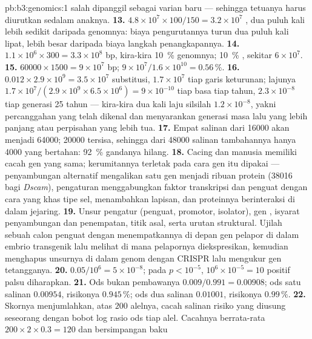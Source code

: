 \begin{solution}{pb:b3:genomics:1}
salah dipanggil sebagai varian baru --- sehingga tetuanya harus diurutkan
sedalam anaknya.
\textbf{13.} $4.8\times 10^{7}\times 100/150 = 3.2\times 10^{7}$ ,
dua puluh kali lebih sedikit daripada genomnya: biaya pengurutannya turun
dua puluh kali lipat, lebih besar daripada biaya langkah penangkapannya.
\textbf{14.} $1.1\times 10^{6}\times 300 = 3.3\times 10^{8}$ bp, kira-kira
\qty{10}{\%} genomnya; \qty{10}{\%} , sekitar $6\times
10^{7}$.
\textbf{15.} $\num{60000}\times 1500 = 9\times 10^{7}$ bp; $9\times
10^{7}/1.6\times 10^{10} = 0.56\,\%$.
\textbf{16.} $0.012\times 2.9\times 10^{9} = 3.5\times 10^{7}$
substitusi, $1.7\times 10^{7}$ tiap garis keturunan; lajunya $1.7\times
10^{7}/(2.9\times 10^{9}\times 6.5\times 10^{6}) = 9\times 10^{-10}$
tiap basa tiap tahun, $2.3\times 10^{-8}$ tiap generasi 25 tahun ---
kira-kira dua kali laju silsilah $1.2\times 10^{-8}$, yakni percanggahan yang
telah dikenal dan menyarankan generasi masa lalu yang lebih panjang atau
perpisahan yang lebih tua.
\textbf{17.} Empat salinan dari \num{16000} akan menjadi \num{64000};
\num{20000} tersisa, sehingga dari \num{48000} salinan tambahannya hanya
\num{4000} yang bertahan: \qty{92}{\%} gandanya hilang.
\textbf{18.} Cacing dan manusia memiliki cacah gen yang sama; kerumitannya
terletak pada cara gen itu dipakai --- penyambungan alternatif mengalikan satu
gen menjadi ribuan protein (\num{38016} bagi \emph{Dscam}), pengaturan
menggabungkan faktor transkripsi dan penguat dengan cara yang khas tipe sel,
 menambahkan lapisan, dan proteinnya berinteraksi di dalam
jejaring.
\textbf{19.} Unsur pengatur (penguat, promotor, isolator),
gen , isyarat penyambungan dan penempatan, titik asal, serta
urutan struktural. Ujilah sebuah calon penguat dengan menempatkannya di depan
gen pelapor di dalam embrio transgenik lalu melihat di mana pelapornya
diekspresikan, kemudian menghapus unsurnya di dalam genom dengan CRISPR lalu
mengukur gen tetangganya.
\textbf{20.} $0.05/10^{6} = 5\times 10^{-8}$; pada $p < 10^{-5}$, $10^{6}
\times 10^{-5} = 10$ positif palsu diharapkan.
\textbf{21.} Ods bukan pembawanya $0.009/0.991 = 0.00908$; ods satu salinan
$0.00954$, risikonya $0.945\,\%$; ods dua salinan $0.01001$, risikonya
$0.99\,\%$.
\textbf{22.} Skornya menjumlahkan, atas $200$ alelnya, cacah salinan
risiko yang diusung seseorang dengan bobot log rasio ods tiap alel. Cacahnya
berrata-rata $200\times 2\times 0.3 = 120$ dan bersimpangan baku

\end{solution}
